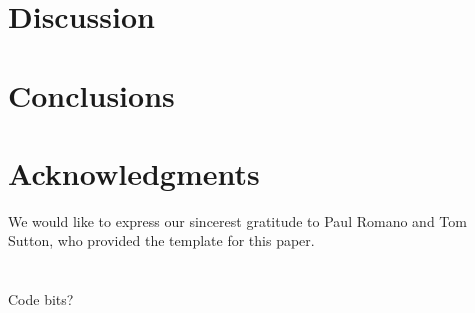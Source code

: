 \documentclass{mc2015}
\begin{document}
\section{Discussion}


\section{Conclusions}


\section{Acknowledgments}

We would like to express our sincerest gratitude to Paul Romano and Tom Sutton, who provided the template for this paper.

\setlength{\baselineskip}{12pt}




\appendix
\section{}

Code bits?

\pageref{lastpage}
\end{document}
